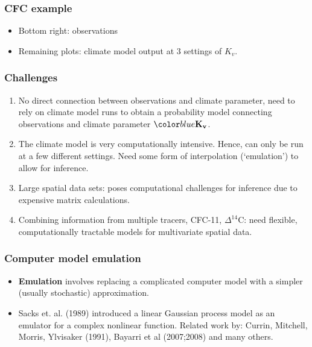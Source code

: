 \documentclass{beamer}
\begin{document}
\begin{frame}
 \frametitle{CFC example  }
 \begin{itemize}
 \item %
Bottom right: observations
\item Remaining plots: climate model output at 3 settings of $K_v$.
     \end{itemize}
\end{frame}

\begin{frame}
 \frametitle{Challenges }
	 \begin{enumerate}
         \item No direct connection between observations and climate
           parameter, need to rely on climate model runs to obtain a
           probability model connecting observations and climate
           parameter $\Kv$.
         \item The climate model is very computationally
           intensive. Hence, can only be run at a few different
           settings. Need some form of interpolation (`emulation') to allow for inference.
	\item Large spatial data sets: poses computational challenges
          for inference due to expensive matrix calculations.
	\item Combining information from multiple tracers, CFC-11,
          $\Delta^{14}$C: need flexible, computationally tractable models for multivariate spatial data.
	\end{enumerate}
\end{frame}


\begin{frame}
  \frametitle{Computer model emulation }
\vspace{-0.4in}
  \begin{figure}
\begin{center} 
\end{center}
 \end{figure}
    \begin{itemize}
    \item \textbf{Emulation} involves replacing a complicated computer
      model with a simpler (usually stochastic) approximation.
    \item Sacks et. al. (1989) introduced a linear Gaussian process
      model as an emulator for a complex nonlinear function. Related
      work by: Currin, Mitchell, Morris, Ylvisaker (1991), Bayarri et
      al (2007;2008) and many others.
      \end{itemize}
\end{frame}
\end{document}
